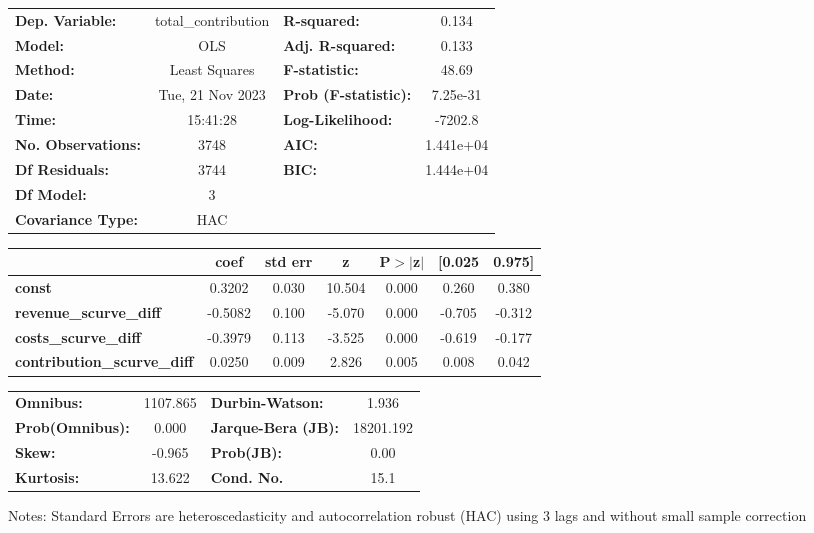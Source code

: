 \begin{center}
\begin{tabular}{lclc}
\toprule
\textbf{Dep. Variable:}             & total\_contribution & \textbf{  R-squared:         } &     0.134   \\
\textbf{Model:}                     &         OLS         & \textbf{  Adj. R-squared:    } &     0.133   \\
\textbf{Method:}                    &    Least Squares    & \textbf{  F-statistic:       } &     48.69   \\
\textbf{Date:}                      &   Tue, 21 Nov 2023  & \textbf{  Prob (F-statistic):} &  7.25e-31   \\
\textbf{Time:}                      &       15:41:28      & \textbf{  Log-Likelihood:    } &   -7202.8   \\
\textbf{No. Observations:}          &          3748       & \textbf{  AIC:               } & 1.441e+04   \\
\textbf{Df Residuals:}              &          3744       & \textbf{  BIC:               } & 1.444e+04   \\
\textbf{Df Model:}                  &             3       & \textbf{                     } &             \\
\textbf{Covariance Type:}           &         HAC         & \textbf{                     } &             \\
\bottomrule
\end{tabular}
\begin{tabular}{lcccccc}
                                    & \textbf{coef} & \textbf{std err} & \textbf{z} & \textbf{P$> |$z$|$} & \textbf{[0.025} & \textbf{0.975]}  \\
\midrule
\textbf{const}                      &       0.3202  &        0.030     &    10.504  &         0.000        &        0.260    &        0.380     \\
\textbf{revenue\_scurve\_diff}      &      -0.5082  &        0.100     &    -5.070  &         0.000        &       -0.705    &       -0.312     \\
\textbf{costs\_scurve\_diff}        &      -0.3979  &        0.113     &    -3.525  &         0.000        &       -0.619    &       -0.177     \\
\textbf{contribution\_scurve\_diff} &       0.0250  &        0.009     &     2.826  &         0.005        &        0.008    &        0.042     \\
\bottomrule
\end{tabular}
\begin{tabular}{lclc}
\textbf{Omnibus:}       & 1107.865 & \textbf{  Durbin-Watson:     } &     1.936  \\
\textbf{Prob(Omnibus):} &   0.000  & \textbf{  Jarque-Bera (JB):  } & 18201.192  \\
\textbf{Skew:}          &  -0.965  & \textbf{  Prob(JB):          } &      0.00  \\
\textbf{Kurtosis:}      &  13.622  & \textbf{  Cond. No.          } &      15.1  \\
\bottomrule
\end{tabular}
\end{center}

Notes: \newline
 [1] Standard Errors are heteroscedasticity and autocorrelation robust (HAC) using 3 lags and without small sample correction